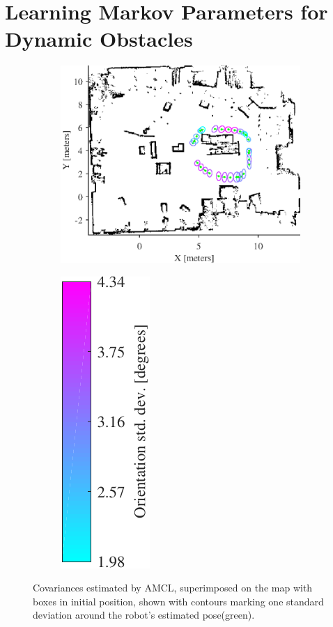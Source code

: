 \section{Learning Markov Parameters for Dynamic Obstacles}
\label{sec:learning_markov_evaluation}

\begin{figure}[htbp]
    \begin{subfigure}[t]{0.7\textwidth}	
        \centering	
        \includegraphics[scale=1.0]{chapters/evaluation/figures/flexlab_path_with_covariance_with_initial_box_positions}
        \end{subfigure}
        \begin{subfigure}[t]{0.2\textwidth}
            \centering
            \includegraphics[scale=1.0]{chapters/evaluation/figures/flexlab_path_with_covariance_bar-crop}
        \end{subfigure}
        \caption{Covariances estimated by AMCL, superimposed on the map with boxes in initial position, shown with contours marking one standard deviation around the robot's estimated pose(green).}
        \label{fig:flexlab_path_with_covariance_first_location_map}
\end{figure}

